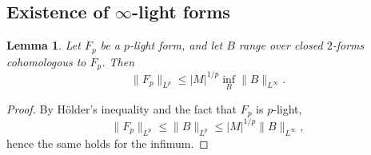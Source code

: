 \documentclass[reqno,11pt]{amsart}
\newcommand*\dif{\mathop{}\!\mathrm{d}}
\newtheorem{lemma}[theorem]{Lemma}
\theoremstyle{definition}
\numberwithin{equation}{section}
\newcommand\todo[1]{\textcolor{red}{TODO: #1}}
\begin{document}

\subsection{\texorpdfstring{Existence of $\infty$-light forms}{Existence of infinity-light forms}}
\begin{lemma}
Let $F_p$ be a $p$-light form, and let $B$ range over closed $2$-forms cohomologous to $F_p$. Then
\begin{equation}\label{infinity magnetic rules p magnetic}
	\|F_p\|_{L^p} \leq |M|^{1/p} \inf_B \|B\|_{L^\infty}.
\end{equation}
\end{lemma}
\begin{proof}
By H\"older's inequality and the fact that $F_p$ is $p$-light,
$$\|F_p\|_{L^p} \leq \|B\|_{L^p} \leq |M|^{1/p} \|B\|_{L^\infty},$$
hence the same holds for the infimum.
\end{proof}
\end{document}
